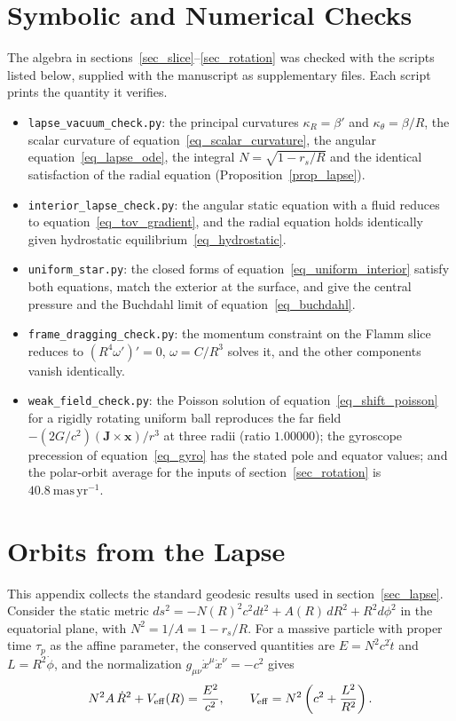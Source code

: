 \documentclass[pdflatex,sn-mathphys-num]{sn-jnl}%
\theoremstyle{thmstyleone}%
\theoremstyle{thmstyletwo}%
\theoremstyle{thmstylethree}%
\begin{document}
\begin{appendices}

\section{Symbolic and Numerical Checks}\label{sec_checks}

The algebra in sections~\ref{sec_slice}--\ref{sec_rotation} was checked with the scripts listed below, supplied with the manuscript as supplementary files. Each script prints the quantity it verifies.
\begin{itemize}
\item \texttt{lapse\_vacuum\_check.py}: the principal curvatures $\kappa_R=\beta'$ and $\kappa_\theta=\beta/R$, the scalar curvature of equation~\eqref{eq_scalar_curvature}, the angular equation~\eqref{eq_lapse_ode}, the integral $N=\sqrt{1-r_s/R}$ and the identical satisfaction of the radial equation (Proposition~\ref{prop_lapse}).
\item \texttt{interior\_lapse\_check.py}: the angular static equation with a fluid reduces to equation~\eqref{eq_tov_gradient}, and the radial equation holds identically given hydrostatic equilibrium~\eqref{eq_hydrostatic}.
\item \texttt{uniform\_star.py}: the closed forms of equation~\eqref{eq_uniform_interior} satisfy both equations, match the exterior at the surface, and give the central pressure and the Buchdahl limit of equation~\eqref{eq_buchdahl}.
\item \texttt{frame\_dragging\_check.py}: the momentum constraint on the Flamm slice reduces to $\left(R^4\omega'\right)'=0$, $\omega=C/R^3$ solves it, and the other components vanish identically.
\item \texttt{weak\_field\_check.py}: the Poisson solution of equation~\eqref{eq_shift_poisson} for a rigidly rotating uniform ball reproduces the far field $-(2G/c^2)(\mathbf{J}\times\mathbf{x})/r^3$ at three radii (ratio $1.00000$); the gyroscope precession of equation~\eqref{eq_gyro} has the stated pole and equator values; and the polar-orbit average for the inputs of section~\ref{sec_rotation} is $40.8~\mathrm{mas\,yr^{-1}}$.
\end{itemize}

\section{Orbits from the Lapse}\label{sec_orbits}

This appendix collects the standard geodesic results used in section~\ref{sec_lapse}. Consider the static metric $ds^2=-N(R)^2c^2dt^2+A(R)\,dR^2+R^2d\phi^2$ in the equatorial plane, with $N^2=1/A=1-r_s/R$. For a massive particle with proper time $\tau_p$ as the affine parameter, the conserved quantities are $E=N^2c^2\dot t$ and $L=R^2\dot\phi$, and the normalization $g_{\mu\nu}\dot x^\mu\dot x^\nu=-c^2$ gives
\begin{equation}
    N^2A\,\dot R^2+V_{\rm eff}(R)=\frac{E^2}{c^2},\qquad V_{\rm eff}=N^2\left(c^2+\frac{L^2}{R^2}\right).
\end{equation}

\end{appendices}
\end{document}
